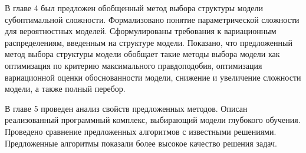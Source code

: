 В главе 4 был предложен обобщенный метод выбора структуры модели субоптимальной сложности. Формализовано понятие параметрической сложности для вероятностных моделей. Сформулированы требования к вариационным распределениям, введенным на структуре модели. Показано, что предложенный метод выбора структуры модели обобщает такие методы выбора модели как оптимизация по критерию максимального правдоподобия, оптимизация вариационной оценки обоснованности модели, снижение и увеличение сложности модели, а также полный перебор.

В главе 5 проведен анализ свойств предложенных методов. Описан реализованный программный комплекс, выбирающий модели глубокого обучения. Проведено сравнение предложенных алгоритмов с известными решениями. Предложенные алгоритмы показали более высокое качество решения задач. 


